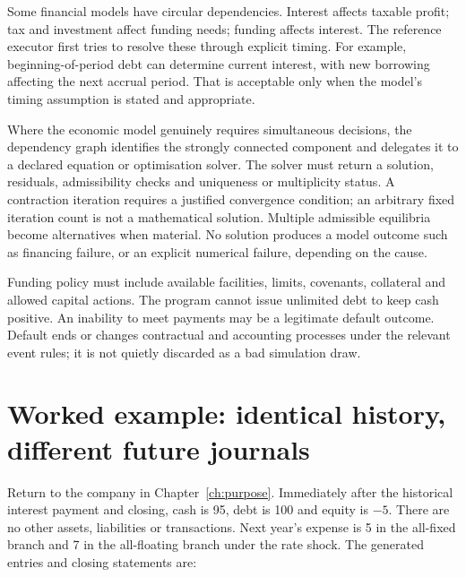 Some financial models have circular dependencies. Interest affects taxable
profit; tax and investment affect funding needs; funding affects interest.
The reference executor first tries to resolve these through explicit timing.
For example, beginning-of-period debt can determine current interest, with
new borrowing affecting the next accrual period. That is acceptable only when
the model's timing assumption is stated and appropriate.

Where the economic model genuinely requires simultaneous decisions, the
dependency graph identifies the strongly connected component and delegates it
to a declared equation or optimisation solver. The solver must return a
solution, residuals, admissibility checks and uniqueness or multiplicity
status. A contraction iteration requires a justified convergence condition;
an arbitrary fixed iteration count is not a mathematical solution. Multiple
admissible equilibria become alternatives when material. No solution produces
a model outcome such as financing failure, or an explicit numerical failure,
depending on the cause.

Funding policy must include available facilities, limits, covenants, collateral
and allowed capital actions. The program cannot issue unlimited debt to keep
cash positive. An inability to meet payments may be a legitimate default
outcome. Default ends or changes contractual and accounting processes under
the relevant event rules; it is not quietly discarded as a bad simulation draw.

\section{Worked example: identical history, different future journals}

Return to the company in Chapter~\ref{ch:purpose}. Immediately after the
historical interest payment and closing, cash is 95, debt is 100 and equity
is $-5$. There are no other assets, liabilities or transactions. Next year's
expense is 5 in the all-fixed branch and 7 in the all-floating branch under
the rate shock. The generated entries and closing statements are:

